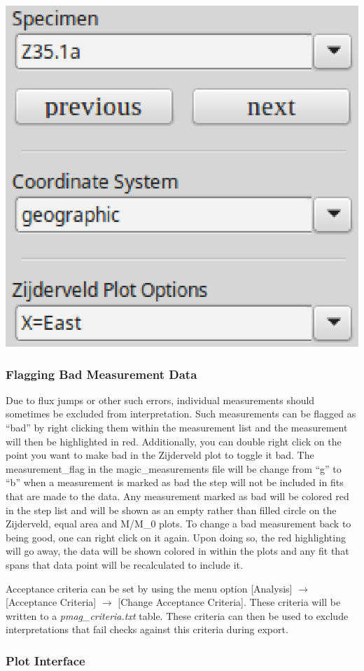 \documentclass[11pt]{book}
\begin{document}
{{\includegraphics[width=5 cm]{EPSFiles/demag_gui_ProjectionChoice.eps}

\subsubsection{Flagging Bad Measurement
Data}\label{flagging-bad-measurement-data}

Due to flux jumps or other such errors, individual measurements should sometimes be excluded from interpretation. Such measurements can be flagged as ``bad'' by right clicking them within the measurement list and the measurement will then be highlighted in red. Additionally, you can double right click on the point you want to make bad in the Zijderveld plot to toggle it bad. The measurement\_flag in the magic\_measurements file will be change from ``g'' to ``b'' when a measurement is marked as bad the step will not be included in fits that are made to the data. Any measurement marked as bad will be colored red in the step list and will be shown as an empty rather than filled circle on the Zijderveld, equal area and M/M\_0 plots. To change a bad measurement back to being good, one can right click on it again. Upon doing so, the red highlighting will go away, the data will be shown colored in within the plots and any fit that spans that data point will be recalculated to include it.

\noindent Acceptance criteria can be set by using the menu option [Analysis] $\rightarrow$ [Acceptance
Criteria] $\rightarrow$ [Change Acceptance Criteria]. These criteria will be written to a {\it pmag\_criteria.txt}  table. These criteria can then be used to exclude interpretations that fail checks against this criteria during export.

\subsubsection{Plot Interface}\label{plot-interface}

}}
\end{document}
